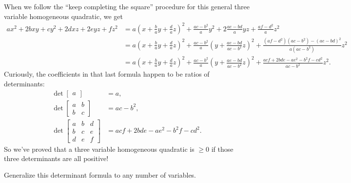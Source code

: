 \documentclass[letterpaper,11pt]{article}
\begin{document}
When we follow the ``keep completing the square'' procedure for this general three variable homogeneous quadratic, we get
\begin{align*}
ax^2 + 2bxy + cy^2 + 2dxz + 2eyz + fz^2 &= a(x + \tfrac{b}{a}y + \tfrac{d}{a}z)^2 + \tfrac{ac-b^2}{a}y^2 + 2\tfrac{ae-bd}{a}yz + \tfrac{af-d^2}{a}z^2\\
&= a(x + \tfrac{b}{a}y + \tfrac{d}{a}z)^2 + \tfrac{ac-b^2}{a}(y + \tfrac{ae-bd}{ac-b^2}z)^2 + \tfrac{(af-d^2)(ac-b^2)-(ae-bd)^2}{a(ac-b^2)}z^2\\
&= a(x + \tfrac{b}{a}y + \tfrac{d}{a}z)^2 + \tfrac{ac-b^2}{a}(y + \tfrac{ae-bd}{ac-b^2}z)^2 + \tfrac{acf + 2bde - ae^2 - b^2f - cd^2}{ac-b^2}z^2.
\end{align*}
Curiously, the coefficients in that last formula happen to be ratios of determinants:
\begin{align*}
\det \begin{bmatrix} a\end{bmatrix} &= a,\\
\det \begin{bmatrix} a & b\\ b & c\end{bmatrix} &= ac - b^2,\\
\det \begin{bmatrix} a & b & d\\ b & c & e\\ d & e & f \end{bmatrix} &= acf + 2bde - ae^2 - b^2f - cd^2.
\end{align*}
So we've proved that a three variable homogeneous quadratic is $\ge 0$ if those three determinants are all positive!

\bigskip

\begin{exer} Generalize this determinant formula to any number of variables.
\end{exer}
\end{document}
